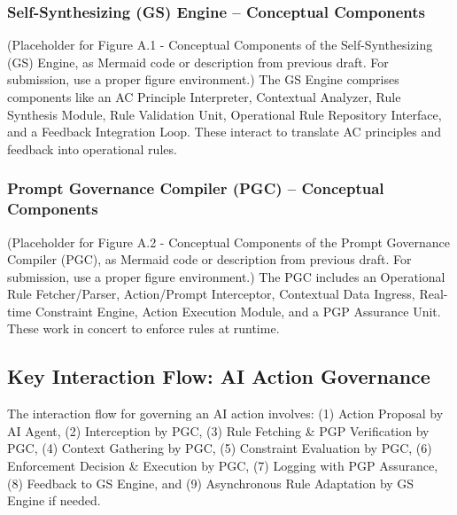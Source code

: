 \documentclass[sigconf,review,anonymous=false]{acmart} %
\begin{document}
\subsubsection{Self-Synthesizing (GS) Engine – Conceptual Components}
\label{app:architecture_details_gs_components}
(Placeholder for Figure A.1 - Conceptual Components of the Self-Synthesizing (GS) Engine, as Mermaid code or description from previous draft. For submission, use a proper figure environment.)
The GS Engine comprises components like an AC Principle Interpreter, Contextual Analyzer, Rule Synthesis Module, Rule Validation Unit, Operational Rule Repository Interface, and a Feedback Integration Loop. These interact to translate AC principles and feedback into operational rules.

\subsubsection{Prompt Governance Compiler (PGC) – Conceptual Components}
\label{app:architecture_details_pgc_components}
(Placeholder for Figure A.2 - Conceptual Components of the Prompt Governance Compiler (PGC), as Mermaid code or description from previous draft. For submission, use a proper figure environment.)
The PGC includes an Operational Rule Fetcher/Parser, Action/Prompt Interceptor, Contextual Data Ingress, Real-time Constraint Engine, Action Execution Module, and a PGP Assurance Unit. These work in concert to enforce rules at runtime.

\subsection{Key Interaction Flow: AI Action Governance}
\label{app:architecture_details_interaction_flow}
The interaction flow for governing an AI action involves: (1) Action Proposal by AI Agent, (2) Interception by PGC, (3) Rule Fetching \& PGP Verification by PGC, (4) Context Gathering by PGC, (5) Constraint Evaluation by PGC, (6) Enforcement Decision \& Execution by PGC, (7) Logging with PGP Assurance, (8) Feedback to GS Engine, and (9) Asynchronous Rule Adaptation by GS Engine if needed.
\end{document}
